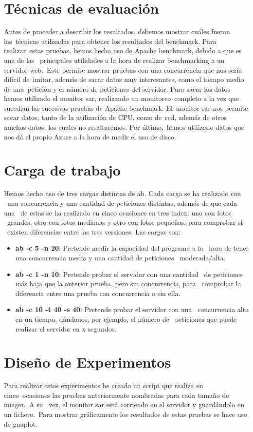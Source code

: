 \documentclass[11pt,twoside,a4paper]{book}
\begin{document}
\section{Técnicas de evaluación}
Antes de proceder a describir los resultados, debemos mostrar cuáles fueron las\
técnicas utilizadas para obtener los resultados del benchmark. Para realizar\
estas pruebas, hemos hecho uso de Apache benchmark, debido a que es una de las \
principales utilidades a la hora de realizar benchmarking a un servidor web.\
Este permite mostrar pruebas con una concurrencia que nos sería difícil de\
imitar, además de sacar datos muy interesantes, como el tiempo medio de una\
petición y el número de peticiones del servidor.
Para sacar los datos hemos utilizado el monitor sar, realizando un monitoreo\
completo a la vez que sucedían las sucesivas pruebas de Apache benchmark. El\
monitor sar nos permite sacar datos, tanto de la utilización de CPU, como de\
red, además de otros muchos datos, los cuales no resaltaremos. Por último,\
hemos utilizado datos que nos dá el propio Azure a la hora de medir el uso de disco.


\section{Carga de trabajo}
Hemos hecho uso de tres cargas distintas de ab. Cada carga se ha realizado con \
una concurrencia y una cantidad de peticiones distintas, además de que cada una \
de estas se ha realizado en cinco ocasiones en tres index: uno con fotos \
grandes, otro con fotos medianas y otro con fotos pequeñas, para comprobar si \
existen diferencias entre las tres versiones. Las cargas son:
\begin{itemize}
  \item \textbf{ab -c 5 -n 20}: Pretende medir la capacidad  del programa a la \
  hora de tener una concurrencia media y una cantidad de peticiones \
  moderada/alta.
  \item \textbf{ab -c 1 -n 10}: Pretende probar el servidor con una cantidad \
  de peticiones más baja que la anterior prueba, pero sin concurrencia, para \
  comprobar la diferencia entre una prueba con concurrencia o sin ella.
  \item \textbf{ab -c 10 -t 40 -s 40}: Pretende probar el servidor con una \
  concurrencia alta en un tiempo, dándonos, por ejemplo, el número de \
  peticiones que puede realizar el servidor en x segundos.
\end{itemize}

\section{Diseño de Experimentos}
Para realizar estos experimentos he creado un script que realiza en cinco\
ocasiones las pruebas anteriormente nombradas para cada tamaño de imagen. A su \
vez, el monitor sar está corriendo en el servidor y guardándolo en un fichero.\
Para mostrar gráficamente los resultados de estas pruebas se hace uso de gnuplot.
\end{document}
